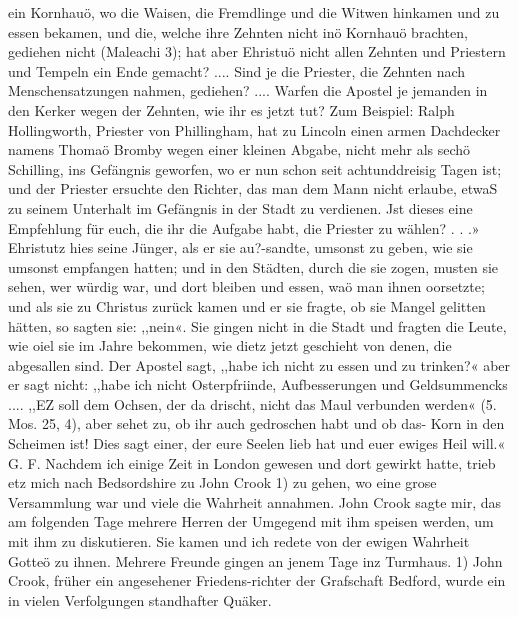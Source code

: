ein Kornhauö, wo die Waisen, die Fremdlinge und die Witwen
hinkamen und zu essen bekamen, und die, welche ihre Zehnten
nicht inö Kornhauö brachten, gediehen nicht (Maleachi 3); hat
aber Ehristuö nicht allen Zehnten und Priestern und Tempeln
ein Ende gemacht? .... Sind je die Priester, die Zehnten nach
Menschensatzungen nahmen, gediehen? .... Warfen die Apostel
je jemanden in den Kerker wegen der Zehnten, wie ihr es jetzt tut?
Zum Beispiel: Ralph Hollingworth, Priester von Phillingham,
hat zu Lincoln einen armen Dachdecker namens Thomaö Bromby
wegen einer kleinen Abgabe, nicht mehr als sechö Schilling, ins
Gefängnis geworfen, wo er nun schon seit achtunddreisig Tagen
ist; und der Priester ersuchte den Richter, das man dem Mann
nicht erlaube, etwaS zu seinem Unterhalt im Gefängnis in der
Stadt zu verdienen. Jst dieses eine Empfehlung für euch, die ihr
die Aufgabe habt, die Priester zu wählen? . . .» Ehristutz hies
seine Jünger, als er sie au?-sandte, umsonst zu geben, wie sie
umsonst empfangen hatten; und in den Städten, durch die sie
zogen, musten sie sehen, wer würdig war, und dort bleiben und
essen, waö man ihnen oorsetzte; und als sie zu Christus zurück
kamen und er sie fragte, ob sie Mangel gelitten hätten, so sagten
sie: ,,nein«. Sie gingen nicht in die Stadt und fragten die
Leute, wie oiel sie im Jahre bekommen, wie dietz jetzt geschieht
von denen, die abgesallen sind. Der Apostel sagt, ,,habe ich
nicht zu essen und zu trinken?« aber er sagt nicht: ,,habe ich nicht
Osterpfriinde, Aufbesserungen und Geldsummencks .... ,,EZ soll
dem Ochsen, der da drischt, nicht das Maul verbunden werden«
(5. Mos. 25, 4), aber sehet zu, ob ihr auch gedroschen habt und
ob das- Korn in den Scheimen ist! Dies sagt einer, der eure
Seelen lieb hat und euer ewiges Heil will.« G. F.
Nachdem ich einige Zeit in London gewesen und dort gewirkt
hatte, trieb etz mich nach Bedsordshire zu John Crook 1) zu gehen,
wo eine grose Versammlung war und viele die Wahrheit annahmen.
John Crook sagte mir, das am folgenden Tage mehrere Herren
der Umgegend mit ihm speisen werden, um mit ihm zu diskutieren.
Sie kamen und ich redete von der ewigen Wahrheit Gotteö zu
ihnen. Mehrere Freunde gingen an jenem Tage inz Turmhaus.
1) John Crook, früher ein angesehener Friedens-richter der Grafschaft
Bedford, wurde ein in vielen Verfolgungen standhafter Quäker.


